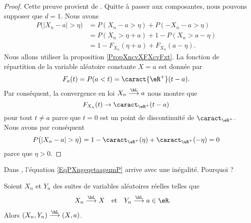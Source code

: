\begin{proof}
    Cette preuve provient de \cite{CourgGudRennes}. Quitte à passer aux composantes, nous pouvons supposer que \( d=1\). Nous avons
    \begin{subequations}
        \begin{align}
           P\big( | X_n-a |>\eta \big)&=P(X_n-a>\eta)+P(-X_n-a>\eta)\\
           &=P(X_n>\eta+a)+1-P(X_n>a-\eta)  \label{EqPXngeqetaapumP}\\
           &=1-F_{X_n}(\eta+a)+F_{X_n}(a-\eta).
        \end{align}
    \end{subequations}
    Nous allons utiliser la proposition \ref{PropXncvXFXcvFxt}. La fonction de répartition de la variable aléatoire constante \( X=a\) est donnée par
    \begin{equation}
        F_a(t)=P(a<t)=\caract{\eR^+}(t-a).
    \end{equation}
    Par conséquent, la convergence en loi \( X_n\stackrel{\hL}{\longrightarrow}a\) nous montre que
    \begin{equation}
        F_{X_n}(t)\to \caract_{\eR^+}(t-a)
    \end{equation}
    pour tout \( t\neq a\) parce que \( t=0\) est un point de discontinuité de \( \caract_{\eR^+}\). Nous avons par conséquent
    \begin{equation}
        P\big( | X_n-a |>\eta \big)=1-\caract_{\eR^+}(\eta)+\caract_{\eR^+}(-\eta)=0
    \end{equation}
    parce que \( \eta>0\).
\end{proof}

\begin{probleme}
    Dans \cite{CourgGudRennes}, l'équation \eqref{EqPXngeqetaapumP} arrive avec une inégalité. Pourquoi ?
\end{probleme}

\begin{lemma}[Slutsky]
    Soient \( X_n\) et \( Y_n\) des suites de variables aléatoires réelles telles que
    \begin{equation}
        \begin{aligned}[]
            X_n&\stackrel{\hL}{\longrightarrow} X&\text{et}&&Y_n&\stackrel{\hL}{\longrightarrow}a\in\eR.
        \end{aligned}
    \end{equation}
    Alors \( (X_n,Y_n)\stackrel{\hL}{\longrightarrow}(X,a)\).
\end{lemma}

